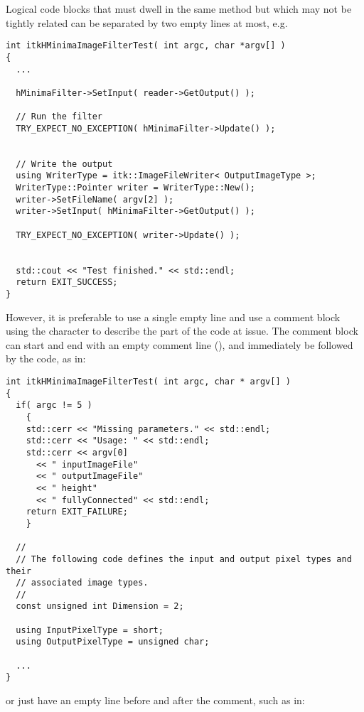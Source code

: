 Logical code blocks that must dwell in the same method but which may not be
tightly related can be separated by two empty lines at most, e.g.

\small
\begin{verbatim}
int itkHMinimaImageFilterTest( int argc, char *argv[] )
{
  ...

  hMinimaFilter->SetInput( reader->GetOutput() );

  // Run the filter
  TRY_EXPECT_NO_EXCEPTION( hMinimaFilter->Update() );


  // Write the output
  using WriterType = itk::ImageFileWriter< OutputImageType >;
  WriterType::Pointer writer = WriterType::New();
  writer->SetFileName( argv[2] );
  writer->SetInput( hMinimaFilter->GetOutput() );

  TRY_EXPECT_NO_EXCEPTION( writer->Update() );


  std::cout << "Test finished." << std::endl;
  return EXIT_SUCCESS;
}
\end{verbatim}
\normalsize


However, it is preferable to use a single empty line and use a comment block
using the \code{//} character to describe the part of the code at issue. The
comment block can start and end with an empty comment line (\code{//}), and
immediately be followed by the code, as in:

\small
\begin{verbatim}
int itkHMinimaImageFilterTest( int argc, char * argv[] )
{
  if( argc != 5 )
    {
    std::cerr << "Missing parameters." << std::endl;
    std::cerr << "Usage: " << std::endl;
    std::cerr << argv[0]
      << " inputImageFile"
      << " outputImageFile"
      << " height"
      << " fullyConnected" << std::endl;
    return EXIT_FAILURE;
    }

  //
  // The following code defines the input and output pixel types and their
  // associated image types.
  //
  const unsigned int Dimension = 2;

  using InputPixelType = short;
  using OutputPixelType = unsigned char;

  ...
}
\end{verbatim}
\normalsize

or just have an empty line before and after the comment, such as in:

